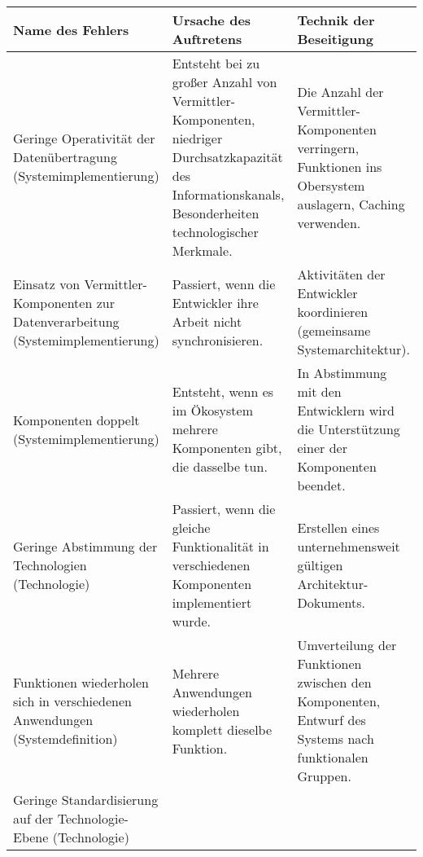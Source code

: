 \documentclass[11pt,a4paper]{article}
\begin{document}
\begin{center}\small
  \begin{tabular}{|p{}|p{}|p{}|}\hline 
    Name des Fehlers & Ursache des Auftretens & Technik der
    Beseitigung\\\hline

    Geringe Operativität der Datenübertragung (Systemimplementierung) &
    
    Entsteht bei zu großer Anzahl von Vermittler-Komponenten,
    niedriger Durchsatzkapazität des Informationskanals,
    Besonderheiten technologischer Merkmale. &
    
    Die Anzahl der Vermittler-Komponenten verringern, Funktionen ins
    Obersystem auslagern, Caching verwenden.\\\hline
    
    Einsatz von Vermittler-Komponenten zur Datenverarbeitung
    (Systemimplementierung) & 
    
    Passiert, wenn die Entwickler ihre Arbeit nicht synchronisieren.&

    Aktivitäten der Entwickler koordinieren (gemeinsame
    Systemarchitektur).\\\hline 

    Komponenten doppelt (Systemimplementierung) &

    Entsteht, wenn es im Ökosystem mehrere Komponenten gibt, die dasselbe
    tun.&

    In Abstimmung mit den Entwicklern wird die Unterstützung einer der
    Komponenten beendet.\\\hline

    Geringe Abstimmung der Technologien (Technologie) &
    
    Passiert, wenn die gleiche Funktionalität in verschiedenen Komponenten
    implementiert wurde. &

    Erstellen eines unternehmensweit gültigen Architektur-Dokuments.\\\hline

    Funktionen wiederholen sich in verschiedenen Anwendungen
    (Systemdefinition) &
    
    Mehrere Anwendungen wiederholen komplett dieselbe Funktion. &

    Umverteilung der Funktionen zwischen den Komponenten, Entwurf des Systems
    nach funktionalen Gruppen.\\\hline

    Geringe Standardisierung auf der Technologie-Ebene (Technologie) &
    

\end{tabular}
\end{center}
\end{document}
